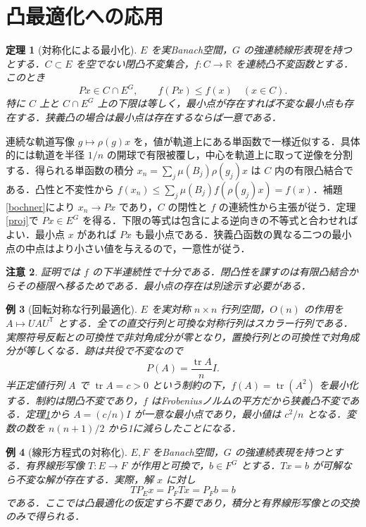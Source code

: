 \documentclass[a5paper,10pt,onecolumn]{jsarticle}
\makeatletter
\theoremstyle{mathnotetheorem}
\newtheorem{theorem}{定理}[section]
\newtheorem{example}[theorem]{例}
\newtheorem{remark}[theorem]{注意}
\renewcommand{\proofname}{証明}
\renewenvironment{proof}[1][\proofname]{%
  \par\pushQED{\qed}\normalfont\topsep4\p@\@plus2\p@\relax
  \trivlist\item[\hskip\labelsep\bfseries #1]\ignorespaces
}{\popQED\endtrivlist\@endpefalse}
\newcommand{\R}{\mathbb{R}}
\makeatother
\begin{document}
\section{凸最適化への応用}
\begin{theorem}[対称化による最小化]\label{convex}
$E$ を実Banach空間，$G$ の強連続線形表現を持つとする．$C\subset E$ を空でない閉凸不変集合，$f:C\to\R$ を連続凸不変函数とする．このとき
\[
 Px\in C\cap E^G,\qquad f(Px)\le f(x)\quad(x\in C).
\]
特に $C$ 上と $C\cap E^G$ 上の下限は等しく，最小点が存在すれば不変な最小点も存在する．狭義凸の場合は最小点は存在するならば一意である．
\end{theorem}
\begin{proof}
連続な軌道写像 $g\mapsto\rho(g)x$ を，値が軌道上にある単函数で一様近似する．具体的には軌道を半径 $1/n$ の開球で有限被覆し，中心を軌道上に取って逆像を分割する．得られる単函数の積分 $x_n=\sum_j\mu(B_j)\rho(g_j)x$ は $C$ 内の有限凸結合である．凸性と不変性から $f(x_n)\le\sum_j\mu(B_j)f(\rho(g_j)x)=f(x)$．補題\ref{bochner}により $x_n\to Px$ であり，$C$ の閉性と $f$ の連続性から主張が従う．定理\ref{proj}で $Px\in E^G$ を得る．下限の等式は包含による逆向きの不等式と合わせればよい．最小点 $x$ があれば $Px$ も最小点である．狭義凸函数の異なる二つの最小点の中点はより小さい値を与えるので，一意性が従う．
\end{proof}
\begin{remark}
証明では $f$ の下半連続性で十分である．閉凸性を課すのは有限凸結合からその極限へ移るためである．最小点の存在は別途示す必要がある．
\end{remark}
\begin{example}[回転対称な行列最適化]
$E$ を実対称 $n\times n$ 行列空間，$O(n)$ の作用を $A\mapsto UAU^{\mathsf T}$ とする．全ての直交行列と可換な対称行列はスカラー行列である．実際符号反転との可換性で非対角成分が零となり，置換行列との可換性で対角成分が等しくなる．跡は共役で不変なので
\[
 P(A)=\frac{\operatorname{tr}A}{n}I.
\]
半正定値行列 $A$ で $\operatorname{tr}A=c>0$ という制約の下，$f(A)=\operatorname{tr}(A^2)$ を最小化する．制約は閉凸不変であり，$f$ はFrobeniusノルムの平方だから狭義凸不変である．定理\ref{convex}から $A=(c/n)I$ が一意な最小点であり，最小値は $c^2/n$ となる．変数の数を $n(n+1)/2$ から1に減らしたことになる．
\end{example}
\begin{example}[線形方程式の対称化]
$E,F$ をBanach空間，$G$ の強連続表現を持つとする．有界線形写像 $T:E\to F$ が作用と可換で，$b\in F^G$ とする．$Tx=b$ が可解なら不変な解が存在する．実際，解 $x$ に対し
\[
 T P_E x=P_F Tx=P_F b=b
\]
である．ここでは凸最適化の仮定すら不要であり，積分と有界線形写像との交換のみで得られる．
\end{example}
\end{document}
